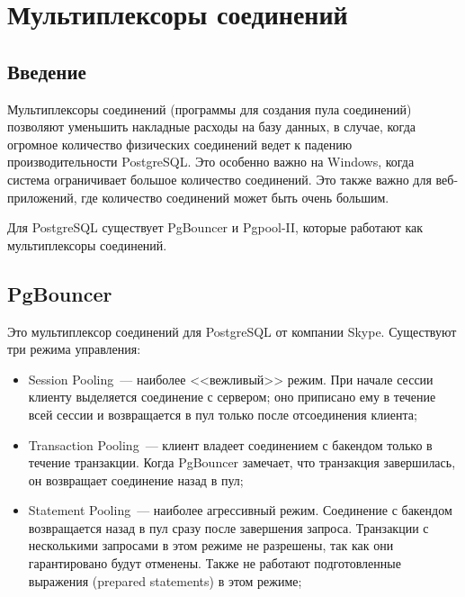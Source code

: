 \chapter{Мультиплексоры соединений}

\begin{epigraphs}
\end{epigraphs}

\section{Введение}

Мультиплексоры соединений (программы для создания пула соединений) позволяют уменьшить накладные расходы на базу данных, в случае, когда огромное количество физических соединений ведет к падению производительности PostgreSQL. Это особенно важно на Windows, когда система ограничивает большое количество соединений. Это также важно для веб-приложений, где количество соединений может быть очень большим.

Для PostgreSQL существует PgBouncer и Pgpool-II, которые работают как мультиплексоры соединений.

\section{PgBouncer}

Это мультиплексор соединений для PostgreSQL от компании Skype. Существуют три режима управления:

\begin{itemize}
  \item Session Pooling~--- наиболее <<вежливый>> режим. При начале сессии клиенту выделяется соединение с сервером; оно приписано ему в течение всей сессии и возвращается в пул только после отсоединения клиента;
  \item Transaction Pooling~--- клиент владеет соединением с бакендом только в течение транзакции. Когда PgBouncer замечает, что транзакция завершилась, он возвращает соединение назад в пул;
  \item Statement Pooling~--- наиболее агрессивный режим. Соединение с бакендом возвращается назад в пул сразу после завершения запроса. Транзакции с несколькими запросами в этом режиме не разрешены, так как они гарантировано будут отменены. Также не работают подготовленные выражения (prepared statements) в этом режиме;
\end{itemize}

